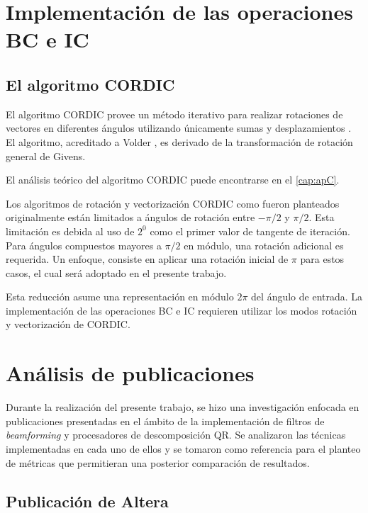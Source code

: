 \section{Implementación de las operaciones BC e IC}

\subsection{El algoritmo CORDIC}
\label{subsec:El_algoritmo_CORDIC}

El algoritmo CORDIC provee un método iterativo para realizar rotaciones de vectores en diferentes ángulos utilizando únicamente sumas y desplazamientos \cite{Andraka}. El algoritmo, acreditado a Volder \cite{Volder}, es derivado de la transformación de rotación general de Givens.

El análisis teórico del algoritmo CORDIC puede encontrarse en el \autoref{cap:apC}.

Los algoritmos de rotación y vectorización CORDIC como fueron planteados originalmente están limitados a ángulos de rotación entre $-\pi/2$ y $\pi/2$. Esta limitación es debida al uso de $2^0$ como el primer valor de tangente de iteración. Para ángulos compuestos mayores a $\pi/2$ en módulo, una rotación adicional es requerida. Un enfoque, consiste en aplicar una rotación inicial de $\pi$ para estos casos, el cual será adoptado en el presente trabajo.

Esta reducción asume una representación en módulo $2\pi$ del ángulo de entrada. La implementación de las operaciones BC e IC requieren utilizar los modos rotación y vectorización de CORDIC.

\newpage

\section{Análisis de publicaciones}
\label{sec:analisis_de_publicaciones}

Durante la realización del presente trabajo, se hizo una investigación enfocada en publicaciones presentadas en el ámbito de la implementación de filtros de \textit{beamforming} y procesadores de descomposición QR. Se analizaron las técnicas implementadas en cada uno de ellos y se tomaron como referencia para el planteo de métricas que permitieran una posterior comparación de resultados.

\subsection{Publicación de Altera}

